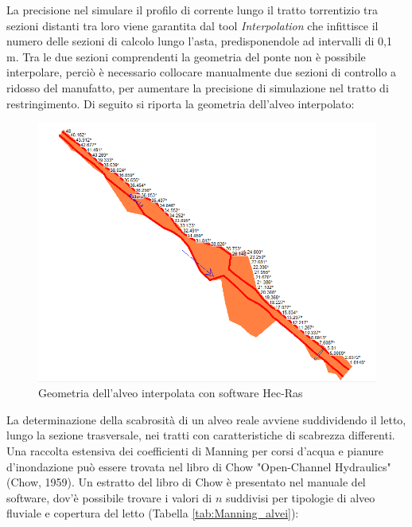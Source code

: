 \documentclass[12pt]{article} %
\begin{document}
%        

\noindent La precisione nel simulare il profilo di corrente lungo il tratto torrentizio tra sezioni distanti tra loro viene garantita dal tool \textit{Interpolation} che infittisce il numero delle sezioni di calcolo lungo l'asta, predisponendole ad intervalli di 0,1 m. Tra le due sezioni comprendenti la geometria del ponte non è possibile interpolare, perciò è necessario collocare manualmente due sezioni di controllo a ridosso del manufatto, per aumentare la precisione di simulazione nel tratto di restringimento.
Di seguito si riporta la geometria dell'alveo interpolato:

\begin{figure}[H]
    \centering
    \includegraphics[scale=0.69]{GeometriaSturla.PNG}
    \caption{Geometria dell'alveo interpolata con software Hec-Ras}
\end{figure}

\noindent La determinazione della scabrosità di un alveo reale avviene suddividendo il letto, lungo la sezione trasversale, nei tratti con caratteristiche di scabrezza differenti. Una raccolta estensiva dei coefficienti di Manning per corsi d'acqua e pianure d'inondazione può essere trovata nel libro di Chow "Open-Channel Hydraulics" (Chow, 1959). Un estratto del libro di Chow è presentato nel manuale del software, dov'è possibile trovare i valori di $n$ suddivisi per tipologie di alveo fluviale e copertura del letto (Tabella \ref{tab:Manning_alvei}):
\end{document}
